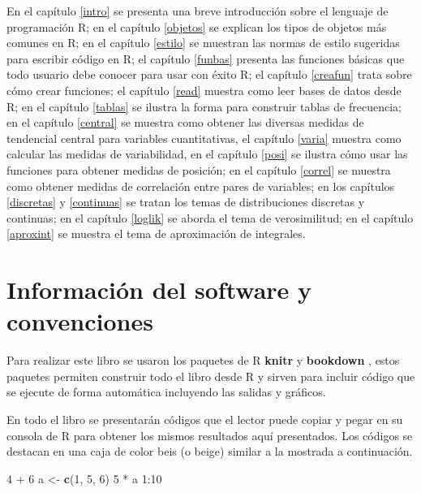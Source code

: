 \documentclass[10pt,]{krantz}
\makeatletter
\newenvironment{Shaded}{\begin{snugshade}}{\end{snugshade}}
\newcommand{\KeywordTok}[1]{\textcolor[rgb]{0.13,0.29,0.53}{\textbf{{#1}}}}
\newcommand{\DecValTok}[1]{\textcolor[rgb]{0.00,0.00,0.81}{{#1}}}
\newcommand{\StringTok}[1]{\textcolor[rgb]{0.31,0.60,0.02}{{#1}}}
\newcommand{\NormalTok}[1]{{#1}}
\let\proglang=\textsf
\newenvironment{kframe}{%
\medskip{}
\setlength{\fboxsep}{.8em}
 \def\at@end@of@kframe{}%
 \ifinner\ifhmode%
  \def\at@end@of@kframe{\end{minipage}}%
  \begin{minipage}{\columnwidth}%
 \fi\fi%
 \def\FrameCommand##1{\hskip\@totalleftmargin \hskip-\fboxsep
 \colorbox{shadecolor}{##1}\hskip-\fboxsep
     \hskip-\linewidth \hskip-\@totalleftmargin \hskip\columnwidth}%
 \MakeFramed {\advance\hsize-\width
   \@totalleftmargin\z@ \linewidth\hsize
   \@setminipage}}%
 {\par\unskip\endMakeFramed%
 \at@end@of@kframe}
\renewenvironment{Shaded}{\begin{kframe}}{\end{kframe}}
\makeatother
\begin{document}
En el capítulo \ref{intro} se presenta una breve introducción sobre el
lenguaje de programación \proglang{R}; en el capítulo \ref{objetos} se
explican los tipos de objetos más comunes en \proglang{R}; en el
capítulo \ref{estilo} se muestran las normas de estilo sugeridas para
escribir código en \proglang{R}; el capítulo \ref{funbas} presenta las
funciones básicas que todo usuario debe conocer para usar con éxito
\proglang{R}; el capítulo \ref{creafun} trata sobre cómo crear
funciones; el capítulo \ref{read} muestra como leer bases de datos desde
\proglang{R}; en el capítulo \ref{tablas} se ilustra la forma para
construir tablas de frecuencia; en el capítulo \ref{central} se muestra
como obtener las diversas medidas de tendencial central para variables
cuantitativas, el capítulo \ref{varia} muestra como calcular las medidas
de variabilidad, en el capítulo \ref{posi} se ilustra cómo usar las
funciones para obtener medidas de posición; en el capítulo \ref{correl}
se muestra como obtener medidas de correlación entre pares de variables;
en los capítulos \ref{discretas} y \ref{continuas} se tratan los temas
de distribuciones discretas y continuas; en el capítulo \ref{loglik} se
aborda el tema de verosimilitud; en el capítulo \ref{aproxint} se
muestra el tema de aproximación de integrales.

\section*{Información del software y
convenciones}\label{informacion-del-software-y-convenciones}


Para realizar este libro se usaron los paquetes de \proglang{R}
\textbf{knitr} \citep{xie2015} y
\textbf{bookdown} \citep{R-bookdown}, estos paquetes
permiten construir todo el libro desde \proglang{R} y sirven para
incluir código que se ejecute de forma automática incluyendo las salidas
y gráficos.

En todo el libro se presentarán códigos que el lector puede copiar y
pegar en su consola de \proglang{R} para obtener los mismos resultados
aquí presentados. Los códigos se destacan en una caja de color beis (o
beige) similar a la mostrada a continuación.

\begin{Shaded}
\begin{Highlighting}[]
\DecValTok{4} \NormalTok{+}\StringTok{ }\DecValTok{6}
\NormalTok{a <-}\StringTok{ }\KeywordTok{c}\NormalTok{(}\DecValTok{1}\NormalTok{, }\DecValTok{5}\NormalTok{, }\DecValTok{6}\NormalTok{)}
\DecValTok{5} \NormalTok{*}\StringTok{ }\NormalTok{a}
\DecValTok{1}\NormalTok{:}\DecValTok{10}
\end{Highlighting}
\end{Shaded}
\end{document}
